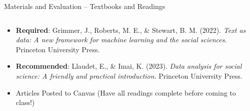 \documentclass[
  ignorenonframetext,
]{beamer}
\begin{document}
\begin{frame}{Materials and Evaluation -- Textbooks and Readings}
\label{materials-and-evaluation-textbooks-and-readings}
\begin{columns}[T] %
  \begin{column}{0.65\textwidth}
  \par \vspace{2.5mm}
  
  \begin{itemize}
  
  \item  \textbf{Required}: Grimmer, J., Roberts, M. E., \& Stewart, B. M. (2022). \emph{Text as data: A new framework for machine learning and the social sciences}. Princeton University Press. \par \vspace{2.5mm}
  
  \item \textbf{Recommended}: Llaudet, E., \& Imai, K. (2023). \emph{Data analysis for social science: A friendly and practical introduction}. Princeton University Press. \par \vspace{2.5mm}
  
  \item Articles Posted to Canvas (Have all readings complete before coming to class!)
  
  \end{itemize}
  \end{column}


\end{columns}
\end{frame}
\end{document}

